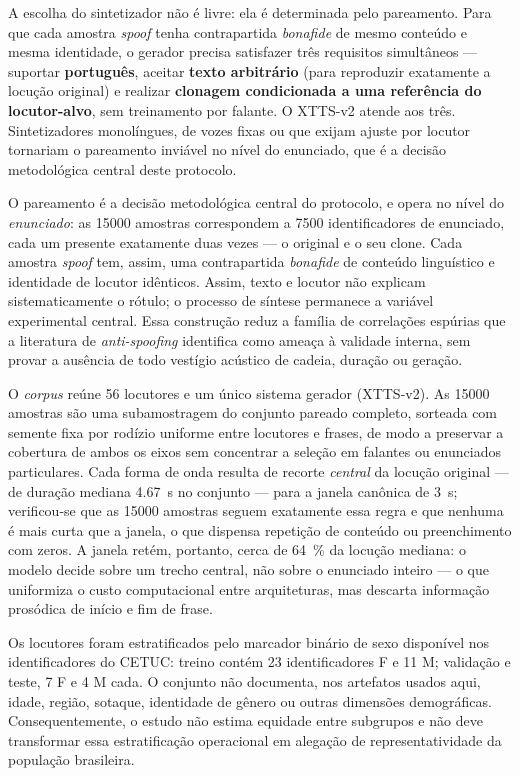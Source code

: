 \documentclass[12pt,a4paper]{article}
\begin{document}
A escolha do sintetizador não é livre: ela é determinada pelo pareamento. Para
que cada amostra \textit{spoof} tenha contrapartida \textit{bonafide} de mesmo
conteúdo e mesma identidade, o gerador precisa satisfazer três requisitos
simultâneos --- suportar \textbf{português}, aceitar \textbf{texto arbitrário}
(para reproduzir exatamente a locução original) e realizar \textbf{clonagem
	condicionada a uma referência do locutor-alvo}, sem treinamento por falante. O
XTTS-v2 atende aos três. Sintetizadores monolíngues, de vozes fixas ou que
exijam ajuste por locutor tornariam o pareamento inviável no nível do
enunciado, que é a decisão metodológica central deste protocolo.

O pareamento é a decisão metodológica central do protocolo, e opera no nível do
\emph{enunciado}: as \num{15000} amostras correspondem a
\num[group-minimum-digits=4]{7500} identificadores de enunciado, cada um
presente exatamente duas vezes --- o original e o seu clone. Cada amostra
\textit{spoof} tem, assim, uma contrapartida \textit{bonafide} de conteúdo
linguístico e identidade de locutor idênticos. Assim, texto e locutor não
explicam sistematicamente o rótulo; o processo de síntese permanece a variável
experimental central. Essa construção reduz a família de correlações espúrias
que a literatura de \textit{anti-spoofing} identifica como ameaça à validade
interna, sem provar a ausência de todo vestígio acústico de cadeia, duração ou
geração.

O \textit{corpus} reúne \num{56} locutores e um único sistema gerador
(XTTS-v2). As \num{15000} amostras são uma subamostragem do conjunto pareado
completo, sorteada com semente fixa por rodízio uniforme entre locutores e
frases, de modo a preservar a cobertura de ambos os eixos sem concentrar a
seleção em falantes ou enunciados particulares. Cada forma de onda resulta de
recorte \emph{central} da locução original --- de duração mediana
\SI{4,67}{\second} no conjunto --- para a janela canônica de \SI{3}{\second};
verificou-se que as \num{15000} amostras seguem exatamente essa regra e que
nenhuma é mais curta que a janela, o que dispensa repetição de conteúdo ou
preenchimento com zeros. A janela retém, portanto, cerca de
\SI{64}{\percent} da locução mediana: o modelo decide sobre um trecho central,
não sobre o enunciado inteiro --- o que uniformiza o custo computacional entre
arquiteturas, mas descarta informação prosódica de início e fim de frase.

Os locutores foram estratificados pelo marcador binário de sexo disponível nos
identificadores do CETUC: treino contém \num{23} identificadores F e \num{11} M;
validação e teste, \num{7} F e \num{4} M cada. O conjunto não documenta, nos
artefatos usados aqui, idade, região, sotaque, identidade de gênero ou outras
dimensões demográficas. Consequentemente, o estudo não estima equidade entre
subgrupos e não deve transformar essa estratificação operacional em alegação de
representatividade da população brasileira.
\end{document}
